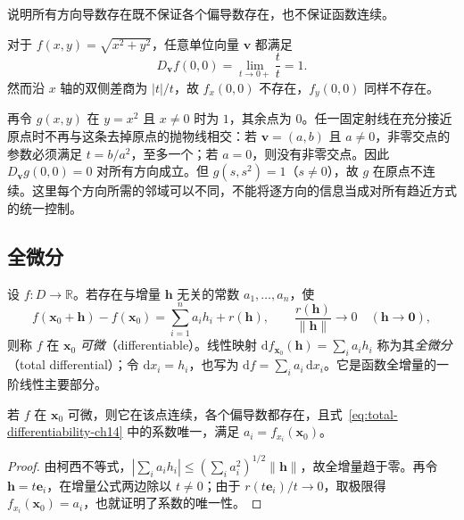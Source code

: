 \begin{example}
\label{ex:directional-derivatives-without-continuity-ch14}
说明所有方向导数存在既不保证各个偏导数存在，也不保证函数连续。
\end{example}
\begin{solve}
对于 $f(x,y)=\sqrt{x^2+y^2}$，任意单位向量 $\boldsymbol v$ 都满足
\[
    D_{\boldsymbol v}f(0,0)=\lim_{t\to0+}\frac{t}{t}=1.
\]
然而沿 $x$ 轴的双侧差商为 $|t|/t$，故 $f_x(0,0)$ 不存在，$f_y(0,0)$ 同样不存在。

再令 $g(x,y)$ 在 $y=x^2$ 且 $x\ne0$ 时为 $1$，其余点为 $0$。任一固定射线在充分接近原点时不再与这条去掉原点的抛物线相交：若 $\boldsymbol v=(a,b)$ 且 $a\ne0$，非零交点的参数必须满足 $t=b/a^2$，至多一个；若 $a=0$，则没有非零交点。因此 $D_{\boldsymbol v}g(0,0)=0$ 对所有方向成立。但 $g(s,s^2)=1$（$s\ne0$），故 $g$ 在原点不连续。这里每个方向所需的邻域可以不同，不能将逐方向的信息当成对所有趋近方式的统一控制。
\end{solve}

\subsection{全微分}
\label{subsec:total-differentials}

\begin{definition}
\label{def:total-differentiability-ch14}
设 $f:D\to\mathbb R$。若存在与增量 $\boldsymbol h$ 无关的常数 $a_1,\ldots,a_n$，使
\begin{equation}
\label{eq:total-differentiability-ch14}
    f(\boldsymbol x_0+\boldsymbol h)-f(\boldsymbol x_0)
    =\sum_{i=1}^n a_i h_i+r(\boldsymbol h),
    \qquad \frac{r(\boldsymbol h)}{\|\boldsymbol h\|}\longrightarrow0
    \quad(\boldsymbol h\to\boldsymbol0),
\end{equation}
则称 $f$ 在 $\boldsymbol x_0$ \emph{可微}（differentiable）。线性映射
$\mathrm df_{\boldsymbol x_0}(\boldsymbol h)=\sum_i a_i h_i$ 称为其\emph{全微分}（total differential）；令 $\mathrm dx_i=h_i$，也写为 $\mathrm df=\sum_i a_i\,\mathrm dx_i$。它是函数全增量的一阶线性主要部分。
\end{definition}

\begin{theorem}
\label{thm:differentiability-implies-partials-ch14}
若 $f$ 在 $\boldsymbol x_0$ 可微，则它在该点连续，各个偏导数都存在，且式~\eqref{eq:total-differentiability-ch14} 中的系数唯一，满足 $a_i=f_{x_i}(\boldsymbol x_0)$。
\end{theorem}
\begin{proof}
由柯西不等式，$|\sum_i a_i h_i|\leq(\sum_i a_i^2)^{1/2}\|\boldsymbol h\|$，故全增量趋于零。再令 $\boldsymbol h=t\boldsymbol e_i$，在增量公式两边除以 $t\ne0$；由于 $r(t\boldsymbol e_i)/t\to0$，取极限得 $f_{x_i}(\boldsymbol x_0)=a_i$，也就证明了系数的唯一性。
\end{proof}

